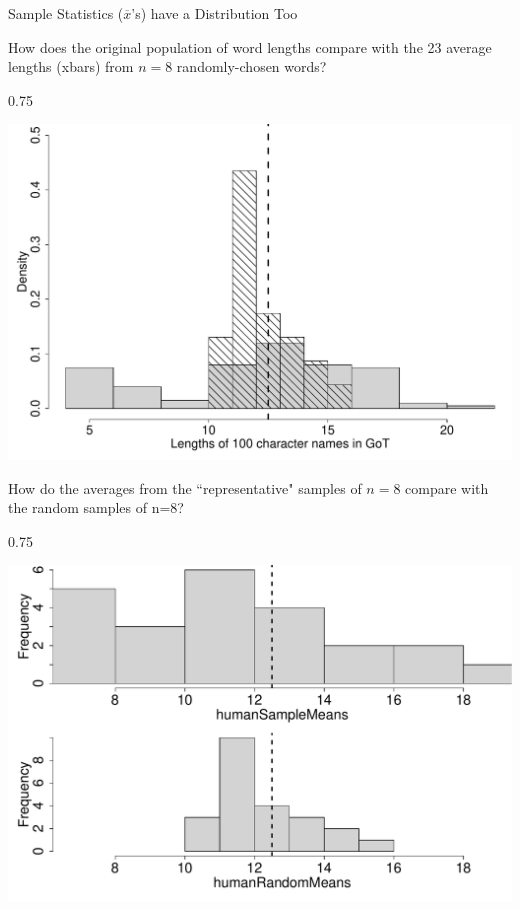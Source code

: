 \documentclass{beamer}\usepackage[]{graphicx}\usepackage[]{color}
\newenvironment{knitrout}{}{} %
\renewenvironment{knitrout}{\begin{spacing}{0.75}\begin{tiny}}{\end{tiny}\end{spacing}}
\newcommand{\xbar}{\overline{x}}
\begin{document}
\begin{frame}{Sample Statistics ($\xbar$'s) have a Distribution Too\;\;}
\newpage

How does the original population of word lengths compare
with the 23 average lengths
(xbars) from  $n=8$ randomly-chosen words?
\begin{knitrout}\small
{}\color{fgcolor}

{\centering \includegraphics[width=0.79\linewidth]{figure/graphics-histogram-humanRandomMeans-2-1} 

}



\end{knitrout}

\newpage

How do the averages from the ``representative" samples of $n=8$
compare with the random samples of n=8?
\begin{knitrout}\small
{}\color{fgcolor}

{\centering \includegraphics[width=0.79\linewidth]{figure/graphics-unnamed-chunk-25-1} 

}



\end{knitrout}


\end{frame}
\end{document}
